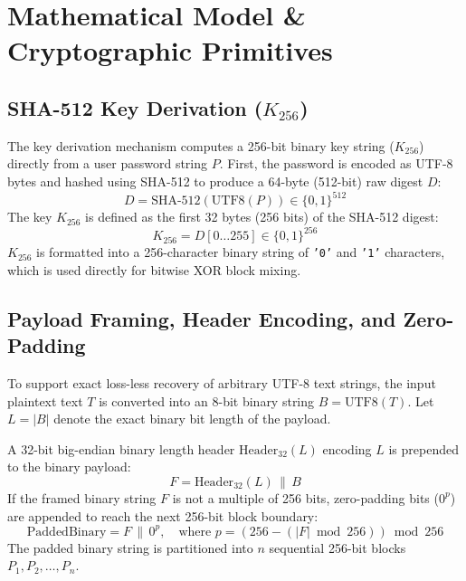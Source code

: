 \section{Mathematical Model \& Cryptographic Primitives}
\label{sec:methodology}

\subsection{SHA-512 Key Derivation ($K_{256}$)}
\label{subsec:sha512_k256}
The key derivation mechanism computes a 256-bit binary key string ($K_{256}$) directly from a user password string $P$. First, the password is encoded as UTF-8 bytes and hashed using SHA-512 to produce a 64-byte (512-bit) raw digest $D$:
\begin{equation}
D = \text{SHA-512}(\text{UTF8}(P)) \in \{0, 1\}^{512}
\label{eq:sha512_digest}
\end{equation}
The key $K_{256}$ is defined as the first 32 bytes (256 bits) of the SHA-512 digest:
\begin{equation}
K_{256} = D[0 \dots 255] \in \{0, 1\}^{256}
\label{eq:k256_extract}
\end{equation}
$K_{256}$ is formatted into a 256-character binary string of \texttt{'0'} and \texttt{'1'} characters, which is used directly for bitwise XOR block mixing.

\subsection{Payload Framing, Header Encoding, and Zero-Padding}
\label{subsec:framing_padding}
To support exact loss-less recovery of arbitrary UTF-8 text strings, the input plaintext text $T$ is converted into an 8-bit binary string $B = \text{UTF8}(T)$. Let $L = |B|$ denote the exact binary bit length of the payload.

A 32-bit big-endian binary length header $\text{Header}_{32}(L)$ encoding $L$ is prepended to the binary payload:
\begin{equation}
F = \text{Header}_{32}(L) \,\|\, B
\label{eq:framed_binary}
\end{equation}
If the framed binary string $F$ is not a multiple of 256 bits, zero-padding bits ($0^p$) are appended to reach the next 256-bit block boundary:
\begin{equation}
\text{PaddedBinary} = F \,\|\, 0^p, \quad \text{where } p = (256 - (|F| \bmod 256)) \bmod 256
\label{eq:zero_padding}
\end{equation}
The padded binary string is partitioned into $n$ sequential 256-bit blocks $P_1, P_2, \dots, P_n$.

